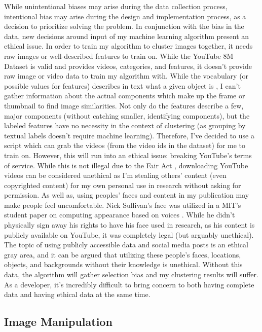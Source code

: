 \documentclass[10pt,twocolumn]{article}
\begin{document}
While unintentional biases may arise during the data collection process, intentional bias may arise during the design and implementation process, as a decision to prioritize solving the problem. In conjunction with the bias in the data, new decisions around input of my machine learning algorithm present an ethical issue. In order to train my algorithm to cluster images together, it needs raw images or well-described features to train on. While the YouTube 8M Dataset is valid and provides videos, categories, and features, it doesn’t provide raw image or video data to train my algorithm with. While the vocabulary (or possible values for features) describes in text what a given object is \cite{googleYT8M}, I can’t gather information about the actual components which make up the frame or thumbnail to find image similarities. Not only do the features describe a few, major components (without catching smaller, identifying components), but the labeled features have no necessity in the context of clustering (as grouping by textual labels doesn’t require machine learning). Therefore, I’ve decided to use a script which can grab the videos (from the video ids in the dataset) for me to train on. However, this will run into an ethical issue: breaking YouTube’s terms of service. While this is not illegal due to the Fair Act \cite{YTFairUse}, downloading YouTube videos can be considered unethical as I’m stealing others’ content (even copyrighted content) for my own personal use in research without asking for permission. As well as, using peoples’ faces and content in my publication may make people feel uncomfortable. Nick Sullivan’s face was utilized in a MIT’s student paper on computing appearance based on voices \cite{Hu2019}. While he didn’t physically sign away his rights to have his face used in research, as his content is publicly available on YouTube, it was completely legal (but arguably unethical). The topic of using publicly accessible data and social media posts is an ethical gray area, and it can be argued that utilizing these people’s faces, locations, objects, and backgrounds without their knowledge is unethical. Without this data, the algorithm will gather selection bias and my clustering results will suffer. As a developer, it’s incredibly difficult to bring concern to both having complete data and having ethical data at the same time.

\subsection {Image Manipulation}
\end{document}
